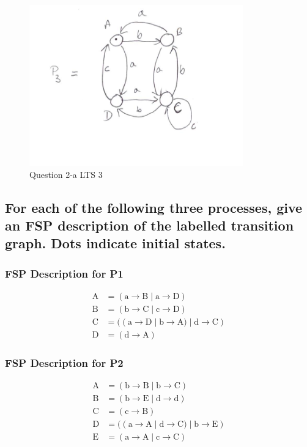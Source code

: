 \documentclass{article}[8pt]
\renewcommand{\thesubsubsection}{\thesection.\alph{subsection}.\Roman{subsubsection}}
\renewcommand{\thesubsection}{\thesection.\alph{subsection}}
\begin{document}
\begin{figure}[H]
	\includegraphics{./imgs/Question-2-a-iii.png}
	\caption{Question 2-a LTS 3}
	\label{fig:Question-2-a-iii-LTS}
\end{figure}

\subsection[~\thesubsection]{For each of the following three processes, give an FSP description of the labelled transition graph. Dots indicate initial states.}

\subsubsection[~\thesubsubsection]{FSP Description for P1}

\begin{align*}
	\text{A} &= (\text{a} \rightarrow \text{B} \; | \; \text{a} \rightarrow \text{D}) \\
	\text{B} &= (\text{b} \rightarrow \text{C} \; | \; \text{c} \rightarrow \text{D}) \\
	\text{C} &= ((\text{a} \rightarrow \text{D} \; | \; \text{b} \rightarrow \text{A}) \; | \; \text{d} \rightarrow \text{C}) \\
	\text{D} &= (\text{d} \rightarrow \text{A})
\end{align*}

\subsubsection[~\thesubsubsection]{FSP Description for P2}

\begin{align*}
	\text{A} &= (\text{b} \rightarrow \text{B} \; | \; \text{b} \rightarrow \text{C}) \\
	\text{B} &= (\text{b} \rightarrow \text{E} \; | \; \text{d} \rightarrow \text{d}) \\
	\text{C} &= (\text{c} \rightarrow \text{B}) \\
	\text{D} &= ((\text{a} \rightarrow \text{A} \; | \; \text{d} \rightarrow \text{C}) \; | \; \text{b} \rightarrow \text{E}) \\
	\text{E} &= (\text{a} \rightarrow \text{A} \; | \; \text{c} \rightarrow \text{C})
\end{align*}
\end{document}
